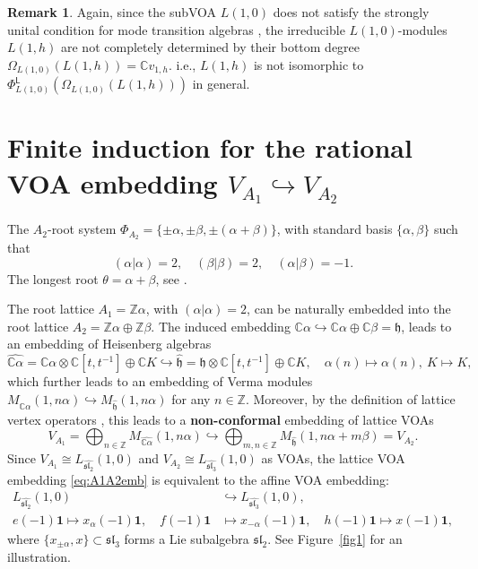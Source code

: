 \documentclass[12pt,a4paper,reqno]{amsart}
\numberwithin{equation}{section}
\numberwithin{equation}{section}
\theoremstyle{definition}
\newtheorem{remark}[thm]{Remark}
\newcommand{\Z}{\mathbb{Z}}
\def \C {\mathbb{C}}
\def \al{\alpha}
\def\hr{\hookrightarrow}
\def \b {\beta}
\def \op {\oplus}
\def \vac {\mathbf{1}}
\def \h {\mathfrak{h}}
\def\L{\mathcal{L}}
\def\o{\otimes}
\def\Om{\Omega}
\def\L{\mathsf{L}}
\def\L{\mathsf{L}}
\def\sl{\mathfrak{sl}}
\begin{document}
	\begin{remark}
		Again, since the subVOA $L(1,0)$ does not satisfy the strongly unital condition for mode transition algebras \cite[Proposition 8.1.1]{DGK23}, the irreducible $L(1,0)$-modules $L(1,h)$ are not completely determined by their bottom degree $\Om_{L(1,0)}(L(1,h))=\C v_{1,h}$. i.e., $L(1,h)$ is not isomorphic to $ \Phi^\L_{L(1,0)}(\Om_{L(1,0)}(L(1,h)))$ in general. %
	\end{remark}
	
	
	
	
	
	\section{Finite induction for the rational VOA embedding $V_{A_1}\hr V_{A_2}$}\label{sec:4}
	
	
	The $A_2$-root system $\Phi_{A_2}=\{\pm \al, \pm \b,\pm(\al+\b)\}$, with standard basis $\{\al,\b\}$ such that 
	\begin{equation}\label{eq:paringinA2lattice}
		(\al|\al)=2,\quad (\b|\b)=2,\quad (\al|\b)=-1.
	\end{equation}
	The longest root $\theta=\al+\b$, see \cite{Hum2}. 
	
	The root lattice $A_1=\Z\al$, with $(\al|\al)=2$, can be naturally embedded into the root lattice $A_2=\Z\al \op \Z\b$. The induced embedding $\C\al\hr \C \al\op \C\b=\h$, leads to an embedding of Heisenberg algebras $$\widehat{\C\al}=\C\al \o \C[t,t^{-1}]\op \C K \hr \hat{\h}=\h\o \C[t,t^{-1}]\op \C K ,\quad \al(n)\mapsto \al(n),\ K\mapsto K,$$
	which further leads to an embedding of Verma modules $M_{\widehat{\C\al}}(1,n\al)\hr M_{\hat{\h}}(1,n\al)$ for any $n\in \Z$. Moreover, by the definition of lattice vertex operators \cite{FLM}, this leads to a {\bf non-conformal} embedding of lattice VOAs
	\begin{equation}\label{eq:A1A2emb}
		V_{A_1}=\bigoplus_{n\in \Z} M_{\widehat{\C\al}}(1,n\al)\hr \bigoplus_{m,n\in \Z}M_{\hat{\h}}(1,n\al+m\b)=V_{A_2}. 
	\end{equation}
	Since $V_{A_1}\cong L_{\widehat{\sl_2}}(1,0)$ and $V_{A_2}\cong L_{\widehat{\sl_3}}(1,0)$ as VOAs, the lattice VOA embedding \eqref{eq:A1A2emb} is equivalent to the affine VOA embedding:
	\begin{equation}\label{eq:affineA1toA2}
		\begin{aligned}
			L_{\widehat{\sl_2}}(1,0)&\hr  L_{\widehat{\sl_3}}(1,0),\\
			e(-1)\vac\mapsto x_\al(-1)\vac,\quad  f(-1)\vac&\mapsto  x_{-\al}(-1)\vac,\quad h(-1)\vac\mapsto x(-1)\vac,
		\end{aligned}
	\end{equation}
	where $\{x_{\pm \al},x\}\subset \sl_3$ forms a Lie subalgebra $\sl_2$. See Figure~\ref{fig1} for an illustration. 
	
\end{document}
